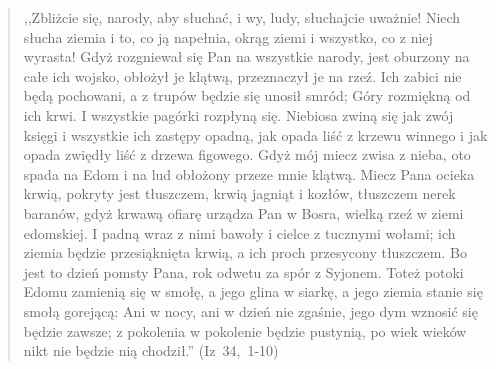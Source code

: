 \documentclass[10pt,a4paper,oneside]{article}
\begin{document}
\begin{quote}
,,Zbliżcie się, narody, aby słuchać, i wy, ludy, słuchajcie uważnie! Niech słucha ziemia i to, co ją napełnia, okrąg ziemi i wszystko, co z niej wyrasta! Gdyż rozgniewał się Pan na wszystkie narody, jest oburzony na całe ich wojsko, obłożył je klątwą, przeznaczył je na rzeź. Ich zabici nie będą pochowani, a z trupów będzie się unosił smród; Góry rozmiękną od ich krwi. I wszystkie pagórki rozpłyną się. Niebiosa zwiną się jak zwój księgi i wszystkie ich zastępy opadną, jak opada liść z krzewu winnego i jak opada zwiędły liść z drzewa figowego. Gdyż mój miecz zwisa z nieba, oto spada na Edom i na lud obłożony przeze mnie klątwą. Miecz Pana ocieka krwią, pokryty jest tłuszczem, krwią jagniąt i kozłów, tłuszczem nerek baranów, gdyż krwawą ofiarę urządza Pan w Bosra, wielką rzeź w ziemi edomskiej. I padną wraz z nimi bawoły i cielce z tucznymi wołami; ich ziemia będzie przesiąknięta krwią, a ich proch przesycony tłuszczem. Bo jest to dzień pomsty Pana, rok odwetu za spór z Syjonem. Toteż potoki Edomu zamienią się w smołę, a jego glina w siarkę, a jego ziemia stanie się smołą gorejącą: Ani w nocy, ani w dzień nie zgaśnie, jego dym wznosić się będzie zawsze; z pokolenia w pokolenie będzie pustynią, po wiek wieków nikt nie będzie nią chodził.'' (Iz~34,~1-10)
\end{quote}
\end{document}
